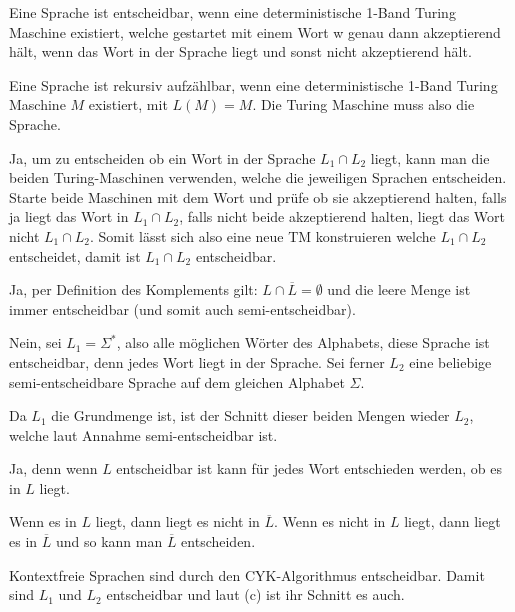 \begin{aufgabe} %
    \begin{teile}
        \item Eine Sprache ist entscheidbar,
        wenn eine deterministische 1-Band Turing Maschine existiert, 
        welche gestartet mit einem Wort w genau dann akzeptierend hält, wenn das Wort in der Sprache liegt und sonst nicht akzeptierend hält.
        \item Eine Sprache ist rekursiv aufzählbar, wenn eine deterministische 1-Band Turing Maschine $M$ existiert, mit $L(M) = M$.
        Die Turing Maschine muss also die Sprache.
        \item Ja, um zu entscheiden ob ein Wort in der Sprache $L_1 \cap L_2$ liegt, kann man die beiden Turing-Maschinen verwenden, welche die jeweiligen Sprachen entscheiden.
        Starte beide Maschinen mit dem Wort und prüfe ob sie akzeptierend halten, falls ja liegt das Wort in $L_1 \cap L_2$, falls nicht beide akzeptierend halten, liegt das Wort nicht $L_1 \cap L_2$.
        Somit lässt sich also eine neue TM konstruieren welche $L_1 \cap L_2$ entscheidet, damit ist $L_1 \cap L_2$ entscheidbar.
        \item Ja, per Definition des Komplements gilt: $L \cap \overline{L} = \emptyset$ und die leere Menge ist immer entscheidbar (und somit auch semi-entscheidbar).
        \item Nein, sei $L_1 = \Sigma^*$, also alle möglichen Wörter des Alphabets, diese Sprache ist entscheidbar, denn jedes Wort liegt in der Sprache. Sei ferner $L_2$ eine beliebige semi-entscheidbare Sprache auf dem gleichen Alphabet $\Sigma$.
        
        Da $L_1$ die Grundmenge ist, ist der Schnitt dieser beiden Mengen wieder $L_2$, welche laut Annahme semi-entscheidbar ist.
        \item Ja, denn wenn $L$ entscheidbar ist kann für jedes Wort entschieden werden, ob es in $L$ liegt.
        
        Wenn es in $L$ liegt, dann liegt es nicht in $\overline{L}$.
        Wenn es nicht in $L$ liegt, dann liegt es in $\overline{L}$ und so kann man $\overline{L}$ entscheiden.
        \item Kontextfreie Sprachen sind durch den CYK-Algorithmus entscheidbar.
        Damit sind $L_1$ und $L_2$ entscheidbar und laut (c) ist ihr Schnitt es auch.
    \end{teile}
\end{aufgabe}











